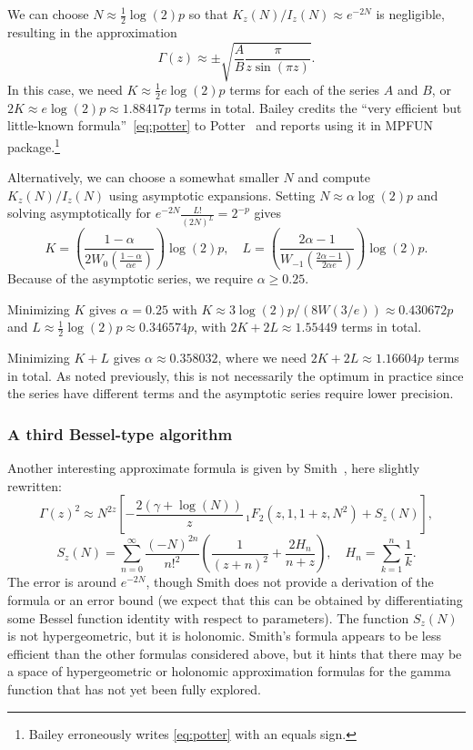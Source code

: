 \documentclass[reqno]{amsart}
\theoremstyle{definition}
\begin{document}
We can choose $N \approx \tfrac{1}{2} \log(2) p$ so that $K_z(N) / I_z(N) \approx e^{-2N}$ is negligible,
resulting in the approximation
\begin{equation}
\Gamma(z) \approx \pm \sqrt{\frac{A}{B} \frac{\pi}{z \sin(\pi z)} }.
\label{eq:potter}
\end{equation}
In this case, we need $K \approx \tfrac{1}{2} e \log(2) p$ terms
for each of the series $A$ and $B$, or $2K \approx e \log(2) p \approx 1.88417 p$ terms in total.
Bailey \cite{bailey2021} credits
the ``very efficient but little-known formula''~\eqref{eq:potter}
to Potter~\cite{potter2014} and reports using it
in MPFUN package.\footnote{Bailey erroneously writes \eqref{eq:potter} with an equals sign.}

Alternatively, we can choose a somewhat smaller $N$ and compute
$K_z(N) / I_z(N)$ using asymptotic expansions.
Setting $N \approx \alpha \log(2) p$ and
solving asymptotically for
$e^{-2N} \frac{L!}{(2N)^L} = 2^{-p}$
gives
\begin{equation}
K = \left(\frac{1-\alpha}{2 W_0\!\left(\frac{1-\alpha}{\alpha e}\right)}\right) \log(2) p, \quad
L = \left(\frac{2\alpha-1}{W_{-1}\!\left(\frac{2 \alpha-1}{2 \alpha e}\right)}\right) \log(2) p.
\end{equation}
Because of the asymptotic series, we require $\alpha \ge 0.25$.

Minimizing $K$ gives $\alpha = 0.25$ with
$K \approx 3 \log(2) p / (8 W(3/e)) \approx 0.430672 p$
and $L \approx \tfrac{1}{2} \log(2) p \approx 0.346574 p$,
with $2K + 2L \approx 1.55449$ terms in total.

Minimizing $K + L$ gives $\alpha \approx 0.358032$,
where we need $2K + 2L \approx 1.16604 p$ terms in total.
As noted previously, this is not necessarily the
optimum in practice since the series have different terms
and the asymptotic series require lower precision.

\subsubsection{A third Bessel-type algorithm}

Another interesting approximate formula
is given by Smith~\cite[eq.\ 94]{smith2006gamma},
here slightly rewritten:
\begin{equation}
\Gamma(z)^2 \approx N^{2z} \left[- \frac{2 (\gamma + \log(N))}{z} \, {}_1F_2(z, 1, 1+z, N^2) + S_z(N) \right],
\end{equation}
\begin{equation}
S_z(N) = \sum_{n=0}^{\infty} \frac{(-N)^{2n}}{n!^2} \left( \frac{1}{(z+n)^2} + \frac{2 H_n}{n+z} \right), \quad H_n = \sum_{k=1}^n \frac{1}{k}.
\end{equation}
The error is around $e^{-2N}$, though Smith does not provide a derivation
of the formula or an error bound (we expect that this can be obtained
by differentiating some Bessel function identity with respect to parameters).
The function $S_z(N)$ is not hypergeometric, but it is holonomic.
Smith's formula appears to be less efficient
than the other formulas considered above, but it hints that there may be a space
of hypergeometric or holonomic approximation formulas for the gamma function
that has not yet been fully explored.
\end{document}
